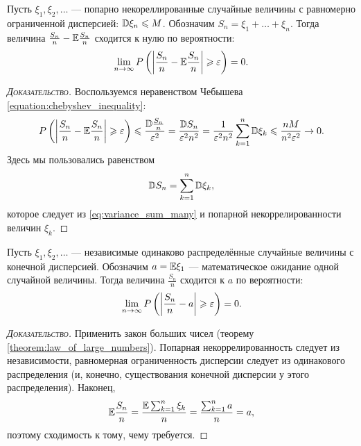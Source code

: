 \documentclass[../main.tex]{subfiles}
\begin{document}
\begin{thm}
 \label{theorem:law_of_large_numbers}
 Пусть $ \xi_1, \xi_2, \ldots $ --- попарно некореллированные случайные величины с равномерно ограниченной дисперсией: $ \mathbb D \xi_n \leqslant M $. Обозначим $ S_n = \xi_1 + \ldots + \xi_n $. Тогда величина $ \frac{S_n}{n}-\mathbb E \frac{S_n}{n} $  сходится к нулю по вероятности:
 \begin{align*}
  \lim_{n \to \infty} P\left(\left| \frac{S_n}{n} - \mathbb E \frac{S_n}{n} \right| \geqslant \varepsilon\right) = 0.
 \end{align*}
\end{thm}
\begin{proof}[\normalfont\textsc{Доказательство}]
 Воспользуемся неравенством Чебышева \eqref{equation:chebyshev_inequality}:
 \begin{align*}
  P \left( \left| \frac{S_n}{n} - \mathbb E \frac{S_n}{n} \right| \geqslant \varepsilon \right) \leqslant \frac{\mathbb D \frac{S_n}{n}}{\varepsilon ^{ 2}} = \frac{\mathbb D S_n}{\varepsilon^{2} n^{2}} = \frac{1}{\varepsilon^{2} n^{2}} \sum_{k=1}^{n}\mathbb D\xi_k \leqslant \frac{nM}{n^{2}\varepsilon^{2}} \to 0.
 \end{align*} Здесь мы пользовались равенством
 \begin{align*}
  \mathbb D S_n = \sum_{k=1}^{n}\mathbb D\xi_k,
 \end{align*} которое следует из \eqref{eq:variance_sum_many} и попарной некоррелированности величин $ \xi_k $.
\end{proof}

\begin{crly}
 \label{corallry:law_of_large_numbers_chebyshev}
 Пусть $ \xi_1, \xi_2, \ldots $  --- независимые одинаково распределённые случайные величины с конечной дисперсией. Обозначим $ a = \mathbb E \xi_1 $ --- математическое ожидание одной случайной величины. Тогда величина $ \frac{S_n}{n} $ сходится к $ a $ по вероятности:
 \begin{align*}
  \lim_{n \to \infty} P \left( \left| \frac{S_n}{n}-a \right|\geqslant\varepsilon \right)=0.
 \end{align*}
\end{crly}
\begin{proof}[\normalfont\textsc{Доказательство}]
 Применить закон больших чисел (теорему \ref{theorem:law_of_large_numbers}). Попарная некоррелированность следует из независимости, равномерная ограниченность дисперсии следует из одинакового распределения (и, конечно, существования конечной дисперсии у этого распределения). Наконец,
 \begin{align*}
  \mathbb E \frac{S_n}{n} = \frac{\mathbb E \sum_{k=1}^{n}\xi_k}{n} = \frac{\sum_{k=1}^{n}a}{n} = a,
 \end{align*} поэтому сходимость к тому, чему требуется.
\end{proof}
\end{document}

